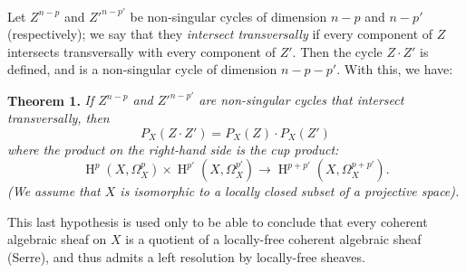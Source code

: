 \documentclass{article}
\newenvironment{itenv}[1]
  {\phantomsection\par\medskip\noindent\textbf{#1.}\itshape}
  {\par\medskip}
\DeclareMathOperator{\HH}{H}
\newcommand{\oldpage}[1]{\marginpar{\footnotesize$\Big\vert$ \textit{p.~#1}}}
\begin{document}
Let $Z^{n-p}$ and $Z'^{n-p'}$ be non-singular cycles of dimension $n-p$ and $n-p'$ (respectively);
we say that they \emph{intersect transversally} if every component of $Z$ intersects transversally with every component of $Z'$.
Then the cycle $Z\cdot Z'$ is defined, and is a non-singular cycle of dimension $n-p-p'$.
With this, we have:

\oldpage{149-11}
\begin{itenv}{Theorem 1}
\label{theorem1}
  If $Z^{n-p}$ and $Z'^{n-p'}$ are non-singular cycles that intersect transversally, then
  \[
  \label{4.4}
    P_X(Z\cdot Z') = P_X(Z)\cdot P_X(Z')
  \tag{4.4}
  \]
  where the product on the right-hand side is the cup product:
  \[
    \HH^p(X,\Omega_X^p)\times\HH^{p'}(X,\Omega_X^{p'}) \to \HH^{p+p'}(X,\Omega_X^{p+p'}).
  \]
  (We assume that $X$ is isomorphic to a locally closed subset of a projective space).
\end{itenv}

This last hypothesis is used only to be able to conclude that every coherent algebraic sheaf on $X$ is a quotient of a locally-free coherent algebraic sheaf (Serre), and thus admits a left resolution by locally-free sheaves.
\end{document}
